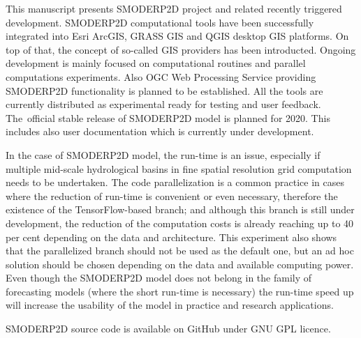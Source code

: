 This manuscript presents SMODERP2D project and related recently
triggered development. SMODERP2D computational tools have been
successfully integrated into Esri ArcGIS, GRASS GIS and QGIS desktop
GIS platforms. On top of that, the concept of so-called GIS providers
has been introducted. Ongoing development is mainly focused on
computational routines and parallel computations experiments. Also OGC
Web Processing Service providing SMODERP2D functionality is planned to
be established. All the tools are currently distributed as
experimental ready for testing and user feedback. The~official stable
release of SMODERP2D model is planned for 2020. This includes also
user documentation which is currently under development.

In the case of SMODERP2D model, the run-time is an issue, especially
if multiple mid-scale hydrological basins in fine spatial resolution
grid computation needs to be undertaken. The code parallelization is a
common practice in cases where the reduction of run-time is convenient
or even necessary, therefore the existence of the TensorFlow-based
branch; and although this branch is still under development, the
reduction of the computation costs is already reaching up to 40
per cent depending on the data and architecture. This experiment also
shows that the parallelized branch should not be used as the default
one, but an ad hoc solution should be chosen depending on the data and
available computing power. Even though the SMODERP2D model does not
belong in the family of forecasting models (where the short run-time
is necessary) the run-time speed up will increase the usability of the
model in practice and research applications.

SMODERP2D source code is available on GitHub
\cite{smoderp2d-github-2019} under GNU GPL licence. 
